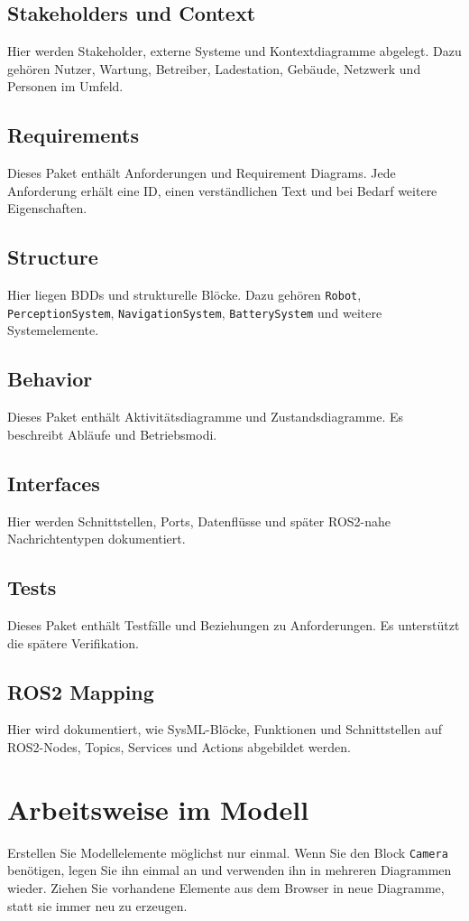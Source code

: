\subsection{Stakeholders und Context}
Hier werden Stakeholder, externe Systeme und Kontextdiagramme abgelegt. Dazu gehören Nutzer, Wartung, Betreiber, Ladestation, Gebäude, Netzwerk und Personen im Umfeld.

\subsection{Requirements}
Dieses Paket enthält Anforderungen und Requirement Diagrams. Jede Anforderung erhält eine ID, einen verständlichen Text und bei Bedarf weitere Eigenschaften.

\subsection{Structure}
Hier liegen BDDs und strukturelle Blöcke. Dazu gehören \texttt{Robot}, \texttt{PerceptionSystem}, \texttt{NavigationSystem}, \texttt{BatterySystem} und weitere Systemelemente.

\subsection{Behavior}
Dieses Paket enthält Aktivitätsdiagramme und Zustandsdiagramme. Es beschreibt Abläufe und Betriebsmodi.

\subsection{Interfaces}
Hier werden Schnittstellen, Ports, Datenflüsse und später ROS2-nahe Nachrichtentypen dokumentiert.

\subsection{Tests}
Dieses Paket enthält Testfälle und Beziehungen zu Anforderungen. Es unterstützt die spätere Verifikation.

\subsection{ROS2 Mapping}
Hier wird dokumentiert, wie SysML-Blöcke, Funktionen und Schnittstellen auf ROS2-Nodes, Topics, Services und Actions abgebildet werden.

\section{Arbeitsweise im Modell}
Erstellen Sie Modellelemente möglichst nur einmal. Wenn Sie den Block \texttt{Camera} benötigen, legen Sie ihn einmal an und verwenden ihn in mehreren Diagrammen wieder. Ziehen Sie vorhandene Elemente aus dem Browser in neue Diagramme, statt sie immer neu zu erzeugen.

